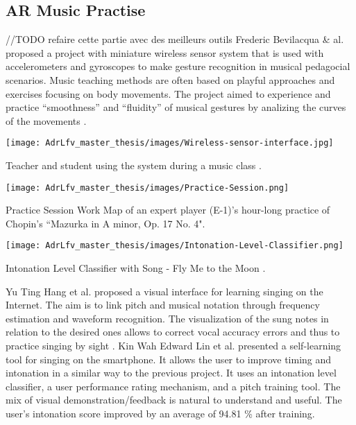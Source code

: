 \subsection{AR Music Practise}
//TODO refaire cette partie avec des meilleurs outils
Frederic Bevilacqua & al. proposed a project with miniature wireless sensor system that is used with accelerometers and gyroscopes to make gesture recognition in musical pedagocial scenarios. Music teaching methods are often based on playful approaches and exercises focusing on body movements. The project aimed to experience and practice “smoothness” and “fluidity” of musical gestures by analizing the curves of the movements \cite{bevilacqua2007wireless}.

\begin{marginfigure}
    \centering
    \texttt{[image: AdrLfv\_master\_thesis/images/Wireless-sensor-interface.jpg]}
    \caption{Teacher and student using the system during a music class \cite{bevilacqua2007wireless}.}
    \label{fig:Wireless-sensor-interface}
\end{marginfigure}

\begin{marginfigure}
    \centering
    \texttt{[image: AdrLfv\_master\_thesis/images/Practice-Session.png]}
    \caption{Practice Session Work Map of an expert player (E-1)’s hour-long practice of Chopin’s “Mazurka in A minor, Op. 17 No. 4".}
    \label{fig:Practice-Session}
\end{marginfigure}

\begin{marginfigure}
    \centering
    \texttt{[image: AdrLfv\_master\_thesis/images/Intonation-Level-Classifier.png]}
    \caption{Intonation Level Classifier with Song - Fly Me to the Moon \cite{lin2014implementation}.}
    \label{fig:Intonation-Level-Classifier}
\end{marginfigure}

Yu Ting Hang et al. proposed a visual interface for learning singing on the Internet. The aim is to link pitch and musical notation through frequency estimation and waveform recognition. The visualization of the sung notes in relation to the desired ones allows to correct vocal accuracy errors and thus to practice singing by sight \cite{huang2016visualized}.
Kin Wah Edward Lin et al. presented a self-learning tool for singing on the smartphone. It allows the user to improve timing and intonation in a similar way to the previous project. It uses an intonation level classifier, a user performance rating mechanism, and a pitch training tool. The mix of visual demonstration/feedback is natural to understand and useful. The user’s intonation score improved by an average of 94.81 \% after training.

